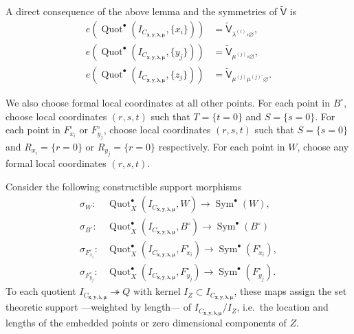 \documentclass[12pt]{amsart}
\theoremstyle{definition}
\newcommand{\sfVtilde}{\widetilde{\mathsf{V}}}
\newcommand{\Sym}{\operatorname{Sym}}
\newcommand{\Quot}{\operatorname{Quot}}
\newcommand{\boldx}{\boldsymbol{x}}
\newcommand{\boldy}{\boldsymbol{y}}
\newcommand{\boldlambda}{\boldsymbol{\lambda }}
\newcommand{\boldmu}{\boldsymbol{\mu }}
\renewcommand{\emptyset}{\varnothing}
\newcommand{\bx}{\square}
\newcommand{\mujprime}{\mu^{(j)\prime}}
\begin{document}
A direct consequence of the above lemma and the symmetries of
$\sfVtilde$ is 
\begin{align}\label{eqn: e(Hilb(Xhat,Chat)=vertex}
e\left(\Quot^{\bullet}\left( I_{C_{\boldx, \boldy, \boldlambda, \boldmu}}, \{x_i\} \right) \right)&=
\sfVtilde_{\lambda^{(i)} \bx  \emptyset }, \\
e\left(\Quot^{\bullet}\left( I_{C_{\boldx, \boldy, \boldlambda, \boldmu}}, \{y_j\} \right) \right)&=
\sfVtilde_{ \mu^{(j)} \bx \emptyset }, \nonumber \\
e\left(\Quot^{\bullet}\left( I_{C_{\boldx, \boldy, \boldlambda, \boldmu}}, \{z_j\} \right) \right)&=
\sfVtilde_{\mu^{(j)} \mujprime \emptyset  }. \nonumber
\end{align}




We also choose formal local coordinates at all other points. For each
point in $B^{\circ}$, choose local coordinates $(r,s,t)$ such that
$T=\{t=0 \}$ and $S=\{s=0 \}$. For each point in $F^{\circ}_{x_{i}}$
or $F^{\circ}_{y_{j}}$, choose local coordinates $(r,s,t)$ such that
$S=\{s=0 \}$ and $R_{x_{i}}=\{r=0 \}$ or $R_{y_{j}}=\{r=0 \}$
respectively. For each point in $W$, choose any formal local
coordinates $(r,s,t)$.

Consider the following constructible support morphisms
\begin{align*}
\sigma_{W}:& \Quot^{\bullet}_X(I_{C_{\boldx, \boldy, \boldlambda, \boldmu}}, W) \to \Sym^{\bullet}(W),\\
\sigma_{B^{\circ }}:& \Quot^{\bullet}_X(I_{C_{\boldx, \boldy, \boldlambda, \boldmu}},B^{\circ}) \to \Sym^{\bullet}(B^{\circ })\\
\sigma_{F_{x_{i}}^{\circ }}:& \Quot^{\bullet}_X(I_{C_{\boldx, \boldy, \boldlambda, \boldmu}},F_{x_{i}}^{\circ}) \to \Sym^{\bullet}(F_{x_{i}}^{\circ }),\\
\sigma_{F_{y_{j}}^{\circ }}:& \Quot^{\bullet}_X(I_{C_{\boldx, \boldy, \boldlambda, \boldmu}},F_{y_{j}}^{\circ}) \to \Sym^{\bullet}(F_{y_{j}}^{\circ }).
\end{align*}
To each quotient $I_{C_{\boldx, \boldy, \boldlambda, \boldmu}} \twoheadrightarrow Q$ with kernel $I_Z \subset I_{C_{\boldx, \boldy, \boldlambda, \boldmu}} $, these maps assign the set theoretic support ---weighted by length--- of $I_{C_{\boldx, \boldy, \boldlambda, \boldmu}} / I_Z$, i.e.~the location and lengths of the embedded points or zero dimensional components of $Z$. 
\end{document}
